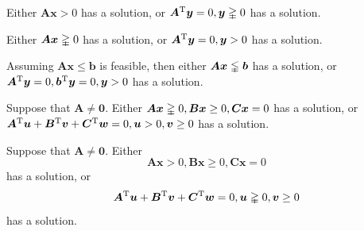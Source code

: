\begin{theorem}[Gordan]\label{The:2:7}
Either $\bm A\bm x>0$ has a solution, or $\bm A^{\mathrm T}\bm y=0,\bm y\gvertneqq0$ has a solution.
\end{theorem}

\begin{theorem}[Stiemke]
Either $\bm A\bm x\gvertneqq0$ has a solution, or $\bm A^{\mathrm T}\bm y=0,\bm y>0$ has a solution.
\end{theorem}

\begin{theorem}[Gale]
Assuming $\bm A\bm x\le\bm b$ is feasible, then either $\bm A\bm x\lvertneqq\bm b$ has a solution, or $\bm A^{\mathrm T}\bm y=0,\bm b^{\mathrm T}\bm y=0,\bm y>0$ has a solution.
\end{theorem}

\begin{theorem}[Tucker]
Suppose that $\bm A\ne\bm0$. Either 
$\bm A\bm x\gvertneqq0,\bm B\bm x\ge0,\bm C\bm x=0$ has a solution,
or $\bm A^{\mathrm T}\bm u+\bm B^{\mathrm T}\bm v+\bm C^{\mathrm T}\bm w=0,\bm u>0,\bm v\ge0$
has a solution.
\end{theorem}

\begin{theorem}[Motzkin]
Suppose that $\bm A\ne\bm0$. Either 
\[
\bm{Ax}>0,\bm B\bm x\ge0,\bm C\bm x=0
\]
has a solution, or
\[
\bm A^{\mathrm T}\bm u+\bm B^{\mathrm T}\bm v+\bm C^{\mathrm T}\bm w=0,
\bm u\gvertneqq0,
\bm v\ge0
\]
has a solution.
\end{theorem}






















